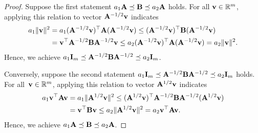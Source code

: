 \documentclass[10pt,a4paper]{amsart}
\def\A{{\bf A}}
\def\B{{\bf B}}
\def\BR{{\mathbb{R}}}
\def\I{{\bf I}}
\def\v{{\bf v}}
\begin{document}
\begin{proof}
Suppose the first statement $a_1\A\preceq\B\preceq a_2\A$ holds.
For all $\v\in\BR^m$, applying this relation to vector $\A^{-1/2}\v$ indicates
\begin{align*}
a_1\|\v\|^2
&=a_1(\A^{-1/2}\v)^{\top}\A(\A^{-1/2}\v)\leq
(\A^{-1/2}\v)^{\top}\B(\A^{-1/2}\v)\\
&=\v^{\top}\A^{-1/2}\B\A^{-1/2}\v
\leq a_2(\A^{-1/2}\v)^{\top}\A(\A^{-1/2}\v)
=a_2\|\v\|^2.
\end{align*}
Hence, we achieve $a_1\I_m\preceq\A^{-1/2}\B\A^{-1/2}\preceq a_2\I_m$.

Conversely, suppose the second statement
$a_1\I_m\preceq\A^{-1/2}\B\A^{-1/2}\preceq a_2\I_m$ holds.
For all~$\v\in\BR^m$, applying this relation to vector $\A^{1/2}\v$ indicates
\begin{align*}
a_1\v^{\top}\A\v
&=a_1\|\A^{1/2}\v\|^2
\leq(\A^{1/2}\v)^{\top}\A^{-1/2}\B\A^{-1/2}(\A^{1/2}\v)\\
&=\v^{\top}\B\v
\leq a_2\|\A^{1/2}\v\|^2
=a_2\v^{\top}\A\v.
\end{align*}
Hence, we achieve
$a_1\A\preceq\B\preceq a_2\A$.
\end{proof}
\end{document}
